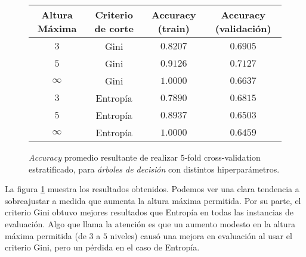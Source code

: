 \vspace{0.5em}
\begin{figure}[!htbp]
    \begin{center}
        \begin{tabular}{ |c|c|c|c| } 
         \hline
        Altura Máxima   & Criterio de corte & Accuracy (train)  & Accuracy (validación) \\
        \hline
        $3$             & Gini              &  $0.8207$         & $0.6905$  \\ 
        $5$             & Gini              &  $0.9126$         & $0.7127$  \\
        $\infty$        & Gini              &  $1.0000$         & $0.6637$  \\ 
        $3$             & Entropía          &  $0.7890$         & $0.6815$  \\
        $5$             & Entropía          &  $0.8937$         & $0.6503$  \\ 
        $\infty$        & Entropía          &  $1.0000$         & $0.6459$  \\ 
        \hline
        \end{tabular}
    \end{center}
    \caption{\textit{Accuracy} promedio resultante de realizar $5$-fold cross-validation estratificado, para \textit{árboles de decisión} con distintos hiperparámetros.} \label{grid_search}
\end{figure}

La figura \ref{grid_search} muestra los resultados obtenidos. Podemos ver una clara tendencia a sobreajustar a medida que aumenta la altura máxima permitida. Por su parte, el criterio Gini obtuvo mejores resultados que Entropía en todas las instancias de evaluación. Algo que llama la atención es que un aumento modesto en la altura máxima permitida (de $3$ a $5$ niveles) causó una mejora en evaluación al usar el criterio Gini, pero un pérdida en el caso de Entropía.

